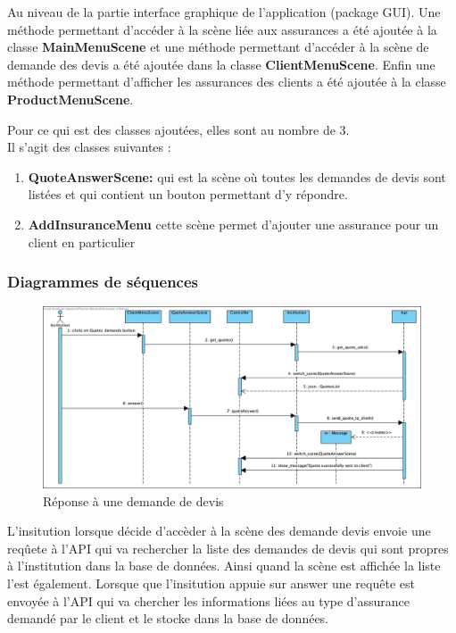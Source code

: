 \documentclass[../rapport.tex]{subfiles}
\begin{document}
		\bigskip

		Au niveau de la partie interface graphique de l'application (package GUI). Une méthode 
		permettant d'accéder à la scène liée aux assurances a été ajoutée à la classe 
		\textbf{MainMenuScene} et une méthode permettant d'accéder à la scène de demande des devis
		a été ajoutée dans la classe \textbf{ClientMenuScene}. Enfin une méthode permettant 
		d'afficher les assurances des clients a été ajoutée à la classe \textbf{ProductMenuScene}.

		\medskip

		Pour ce qui est des classes ajoutées, elles sont au nombre de 3.\\
		Il s'agit des classes suivantes :
		\begin{enumerate}
				\item \textbf{QuoteAnswerScene:} qui est la scène où toutes les demandes de devis
						sont listées et qui contient un bouton permettant d'y répondre.
				\item \textbf{AddInsuranceMenu} cette scène permet d'ajouter une assurance pour
						un client en particulier
		\end{enumerate} 
\newpage
		\subsubsection{Diagrammes de séquences}
				\begin{figure}[h]
						\centering\includegraphics[scale=0.3]{ressources/photos_diagrammes/extensionThomas/reponseDevis.jpg}
						\caption{Réponse à une demande de devis}
				\end{figure}

				L'insitution lorsque décide d'accèder à la scène des demande devis envoie une
				reqûete à l'API qui va rechercher la liste des demandes de devis qui sont propres
				à l'institution dans la base de données. Ainsi quand la scène est affichée la 
				liste l'est également. Lorsque que l'insitution appuie sur answer une requête est
				envoyée à l'API qui va chercher les informations liées au type d'assurance demandé
				par le client et le stocke dans la base de données.
\end{document}
